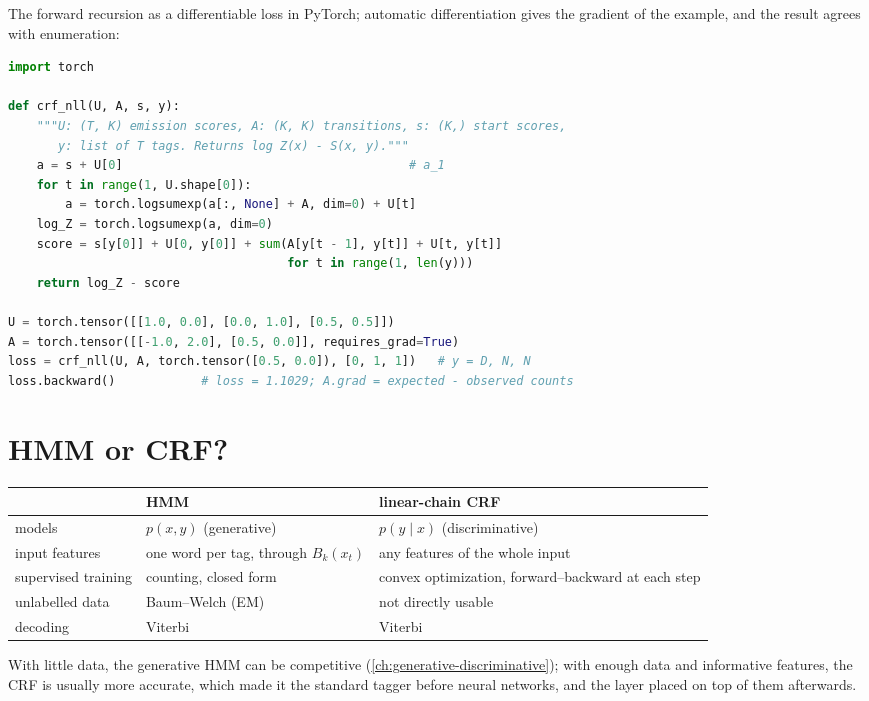 \begin{notechapter}
The forward recursion as a differentiable loss in PyTorch; automatic differentiation gives the
gradient of the example, and the result agrees with enumeration:
\begin{lstlisting}[language=Python]
import torch

def crf_nll(U, A, s, y):
    """U: (T, K) emission scores, A: (K, K) transitions, s: (K,) start scores,
       y: list of T tags. Returns log Z(x) - S(x, y)."""
    a = s + U[0]                                        # a_1
    for t in range(1, U.shape[0]):
        a = torch.logsumexp(a[:, None] + A, dim=0) + U[t]
    log_Z = torch.logsumexp(a, dim=0)
    score = s[y[0]] + U[0, y[0]] + sum(A[y[t - 1], y[t]] + U[t, y[t]]
                                       for t in range(1, len(y)))
    return log_Z - score

U = torch.tensor([[1.0, 0.0], [0.0, 1.0], [0.5, 0.5]])
A = torch.tensor([[-1.0, 2.0], [0.5, 0.0]], requires_grad=True)
loss = crf_nll(U, A, torch.tensor([0.5, 0.0]), [0, 1, 1])   # y = D, N, N
loss.backward()            # loss = 1.1029; A.grad = expected - observed counts
\end{lstlisting}

\section{HMM or CRF?}\label{crf:sec:comparison}

\begin{center}\small
\begin{tabular}{p{}p{}p{}}
 & \textbf{HMM} & \textbf{linear-chain CRF}\\\hline
models & $p(x, y)$ (generative) & $p(y\mid x)$ (discriminative)\\
input features & one word per tag, through $B_k(x_t)$ & any features of the whole input\\
supervised training & counting, closed form & convex optimization, forward--backward at each step\\
unlabelled data & Baum--Welch (EM) & not directly usable\\
decoding & Viterbi & Viterbi
\end{tabular}
\end{center}
With little data, the generative HMM can be competitive (\cref{ch:generative-discriminative});
with enough data and informative features, the CRF is usually more accurate, which made it the
standard tagger before neural networks, and the layer placed on top of them afterwards.


\end{notechapter}
